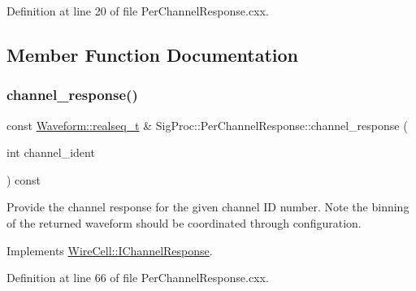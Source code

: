 Definition at line 20 of file Per\+Channel\+Response.\+cxx.



\subsection{Member Function Documentation}
\mbox{\label{class_wire_cell_1_1_sig_proc_1_1_per_channel_response_a9112d33075a8ac432b5e32bed5c65f5b}} 
\subsubsection{\texorpdfstring{channel\+\_\+response()}{channel\_response()}}
{\footnotesize\ttfamily const \hyperlink{namespace_wire_cell_1_1_waveform_a479175e541c8545e87cd8063b74b6956}{Waveform\+::realseq\+\_\+t} \& Sig\+Proc\+::\+Per\+Channel\+Response\+::channel\+\_\+response (\begin{DoxyParamCaption}\item[{int}]{channel\+\_\+ident }\end{DoxyParamCaption}) const\hspace{0.3cm}{\ttfamily [virtual]}}

Provide the channel response for the given channel ID number. Note the binning of the returned waveform should be coordinated through configuration. 

Implements \hyperlink{class_wire_cell_1_1_i_channel_response_aee79a65bc671678d529eca0e4792e10d}{Wire\+Cell\+::\+I\+Channel\+Response}.



Definition at line 66 of file Per\+Channel\+Response.\+cxx.

